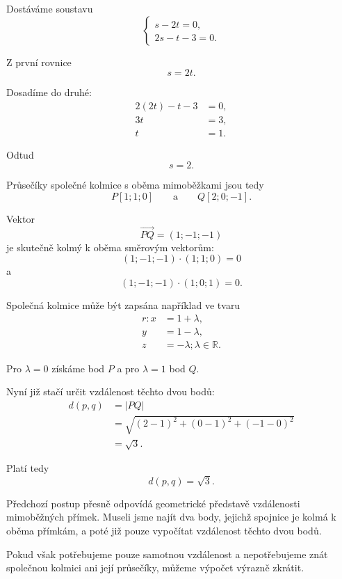 \begin{example}
    Dostáváme soustavu
    \[
        \begin{cases}
            s-2t=0,\\
            2s-t-3=0.
        \end{cases}
    \]

    Z první rovnice
    \[
        s=2t.
    \]

    Dosadíme do druhé:
    \begin{align*}
        2(2t)-t-3&=0,\\
        3t&=3,\\
        t&=1.
    \end{align*}

    Odtud
    \[
        s=2.
    \]

    Průsečíky společné kolmice s oběma mimoběžkami jsou tedy
    \[
        P[1;1;0]
        \qquad\text{a}\qquad
        Q[2;0;-1].
    \]

    Vektor
    \[
        \overrightarrow{PQ}
        =
        (1;-1;-1)
    \]
    je skutečně kolmý k oběma směrovým vektorům:
    \[
        (1;-1;-1)\cdot(1;1;0)=0
    \]
    a
    \[
        (1;-1;-1)\cdot(1;0;1)=0.
    \]

    Společná kolmice může být zapsána například ve tvaru
    \[
        \begin{aligned}
            r: x&=1+\lambda,\\
            y&=1-\lambda,\\
            z&=-\lambda; \lambda\in\mathbb{R}.
        \end{aligned}
    \]

    Pro $\lambda=0$ získáme bod $P$ a pro $\lambda=1$ bod $Q$.

    Nyní již stačí určit vzdálenost těchto dvou bodů:
    \begin{align*}
        d(p,q)
        &=
        |PQ|\\
        &=
        \sqrt{(2-1)^2+(0-1)^2+(-1-0)^2}\\
        &=
        \sqrt3.
    \end{align*}

    Platí tedy
    \[
        d(p,q)=\sqrt3.
    \]
\end{example}

Předchozí postup přesně odpovídá geometrické představě vzdálenosti
mimoběžných přímek. Museli jsme najít dva body, jejichž spojnice
je kolmá k oběma přímkám, a poté již pouze vypočítat vzdálenost
těchto dvou bodů.

Pokud však potřebujeme pouze samotnou vzdálenost a nepotřebujeme
znát společnou kolmici ani její průsečíky, můžeme výpočet výrazně
zkrátit.

